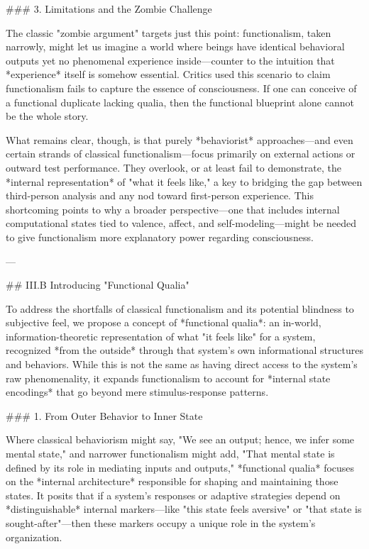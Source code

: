 ### 3. Limitations and the Zombie Challenge

The classic "zombie argument" targets just this point: functionalism, taken narrowly, might let us imagine a world where beings have identical behavioral outputs yet no phenomenal experience inside—counter to the intuition that *experience* itself is somehow essential. Critics used this scenario to claim functionalism fails to capture the essence of consciousness. If one can conceive of a functional duplicate lacking qualia, then the functional blueprint alone cannot be the whole story.

What remains clear, though, is that purely *behaviorist* approaches—and even certain strands of classical functionalism—focus primarily on external actions or outward test performance. They overlook, or at least fail to demonstrate, the *internal representation* of "what it feels like," a key to bridging the gap between third-person analysis and any nod toward first-person experience. This shortcoming points to why a broader perspective—one that includes internal computational states tied to valence, affect, and self-modeling—might be needed to give functionalism more explanatory power regarding consciousness.

---

## III.B Introducing "Functional Qualia"

To address the shortfalls of classical functionalism and its potential blindness to subjective feel, we propose a concept of *functional qualia*: an in-world, information-theoretic representation of what "it feels like" for a system, recognized *from the outside* through that system's own informational structures and behaviors. While this is not the same as having direct access to the system's raw phenomenality, it expands functionalism to account for *internal state encodings* that go beyond mere stimulus-response patterns.

### 1. From Outer Behavior to Inner State

Where classical behaviorism might say, "We see an output; hence, we infer some mental state," and narrower functionalism might add, "That mental state is defined by its role in mediating inputs and outputs," *functional qualia* focuses on the *internal architecture* responsible for shaping and maintaining those states. It posits that if a system's responses or adaptive strategies depend on *distinguishable* internal markers—like "this state feels aversive" or "that state is sought-after"—then these markers occupy a unique role in the system's organization.

